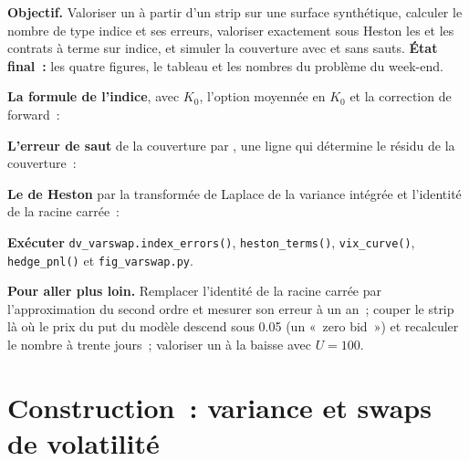 \begin{tutorial}
\textbf{Objectif.} Valoriser un  à partir d'un strip sur une surface synthétique, calculer le nombre de type indice et ses
erreurs, valoriser exactement sous Heston les  et les contrats à terme sur indice, et simuler la couverture avec et sans
sauts. \textbf{État final~:} les quatre figures, le tableau et les nombres du problème du week-end.
\begin{tutsteps}
\item \textbf{La formule de l'indice}, avec $K_0$, l'option moyennée en $K_0$ et la correction de forward~:
\label{lst:dv:variance-swaps-and-volatility-derivatives:index}
\item \textbf{L'erreur de saut} de la couverture par , une ligne qui détermine le résidu de la couverture~:
\label{lst:dv:variance-swaps-and-volatility-derivatives:jump}
\item \textbf{Le  de Heston} par la transformée de Laplace de la variance intégrée et l'identité
de la racine carrée~:
\label{lst:dv:variance-swaps-and-volatility-derivatives:volswap}
\item \textbf{Exécuter} \texttt{dv\_varswap.index\_errors()}, \texttt{heston\_terms()}, \texttt{vix\_curve()},
\texttt{hedge\_pnl()} et \texttt{fig\_varswap.py}.
\end{tutsteps}
\textbf{Pour aller plus loin.} Remplacer l'identité de la racine carrée par l'approximation du second ordre et mesurer son
erreur à un an~; couper le strip là où le prix du put du modèle descend sous 0.05 (un «~zero bid~») et recalculer le
nombre à trente jours~; valoriser un  à la baisse avec $U=100$.
\end{tutorial}

\section{Construction~: variance et swaps de volatilité}\label{bld:dv:variance-swaps-and-volatility-derivatives:varswap}

